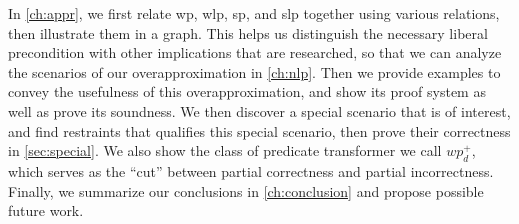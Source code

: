 In \autoref{ch:appr}, we first relate wp, wlp, sp, and slp together using various relations, then illustrate them in a graph. 
This helps us distinguish the necessary liberal precondition with other implications that are researched, so that we can analyze the scenarios of our overapproximation in \autoref{ch:nlp}. 
Then we provide examples to convey the usefulness of this overapproximation, and show its proof system as well as prove its soundness. 
We then discover a special scenario that is of interest, and find restraints that qualifies this special scenario, then prove their correctness in \autoref{sec:special}. 
We also show the class of predicate transformer we call $wp_d^+$, which serves as the ``cut'' between partial correctness and partial incorrectness. 
Finally, we summarize our conclusions in \autoref{ch:conclusion} and propose possible future work. 








